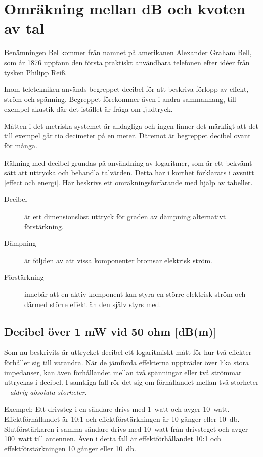 \chapter{Omräkning mellan dB och kvoten av tal}
\label{decibel_2}

\noindent
Benämningen Bel kommer från namnet på amerikanen Alexander Graham
Bell, som år 1876 uppfann den första praktiskt användbara telefonen
efter idéer från tysken Philipp Reiß.

Inom teletekniken används begreppet decibel för att beskriva förlopp
av effekt, ström och spänning. Begreppet förekommer även i andra
sammanhang, till exempel akustik där det istället är fråga om ljudtryck.

Måtten i det metriska systemet är alldagliga och ingen finner det
märkligt att det till exempel går tio decimeter på en meter. Däremot är
begreppet decibel ovant för många.

Räkning med decibel grundas på användning av logaritmer, som är ett
bekvämt sätt att uttrycka och behandla talvärden. Detta har i
korthet förklarats i avsnitt \ref{effect och energi}. Här beskrivs ett
omräkningsförfarande med hjälp av tabeller.

\begin{description}
\item[Decibel] är ett dimensionslöst uttryck för graden av dämpning
  alternativt förstärkning.

\item[Dämpning] är följden av att vissa komponenter bromsar elektrisk
  ström.

\item[Förstärkning] innebär att en aktiv komponent kan styra en större
  elektrisk ström och därmed större effekt än den själv styrs med.
\end{description}

\section{Decibel över 1 mW vid 50 ohm [dB(m)]}

Som nu beskrivits är uttrycket decibel ett logaritmiskt mått för hur
två effekter förhåller sig till varandra. När de jämförda effekterna
uppträder över lika stora impedanser, kan även förhållandet mellan två
spänningar eller två strömmar uttryckas i decibel.
I samtliga fall rör det sig om förhållandet mellan två storheter --
\emph{aldrig absoluta storheter}.

Exempel: Ett drivsteg i en sändare drivs med 1~watt och avger 10~watt.
Effektförhållandet är 10:1 och effektförstärkningen är 10 gånger eller
\SI{10}{\decibel}.
Slutförstärkaren i samma sändare drivs med 10~watt från drivsteget och avger
100~watt till antennen.
Även i detta fall är effektförhållandet 10:1 och effektförstärkningen 10 gånger
eller \SI{10}{\decibel}.

